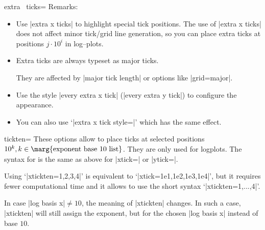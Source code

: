 \begin{pgfplotsxykey}{extra \x\ ticks=}
Remarks:
\begin{itemize} 
\item Use |extra x ticks| to highlight special tick positions. The use of |extra x ticks| does not affect minor tick/grid line generation, so you can place extra ticks at positions $j\cdot 10^i$ in log--plots. 
\item Extra ticks are always typeset as major ticks.

They are affected by |major tick length| or options like |grid=major|.
\item Use the style |every extra x tick| (|every extra y tick|) to configure the appearance.
\item You can also use `|extra x tick style=|' which has the same effect.
\end{itemize}
\end{pgfplotsxykey}

\begin{pgfplotsxykey}{\x tickten=}
These options allow to place ticks at selected positions $10^k, k \in \text{\marg{exponent base 10 list}}$. They are only used for logplots. The syntax for  is the same as above for |xtick=| or |ytick=|.

Using `|xtickten={1,2,3,4}|' is equivalent to `|xtick={1e1,1e2,1e3,1e4}|', but it requires fewer computational time and it allows to use the short syntax `|xtickten={1,...,4}|'.
\begin{codeexample}[]
\end{codeexample}

In case |log basis x|$\neq 10$, the meaning of |xtickten| changes. In such a case, |xtickten| will still assign the exponent, but for the chosen |log basis x| instead of base $10$.
\end{pgfplotsxykey}

